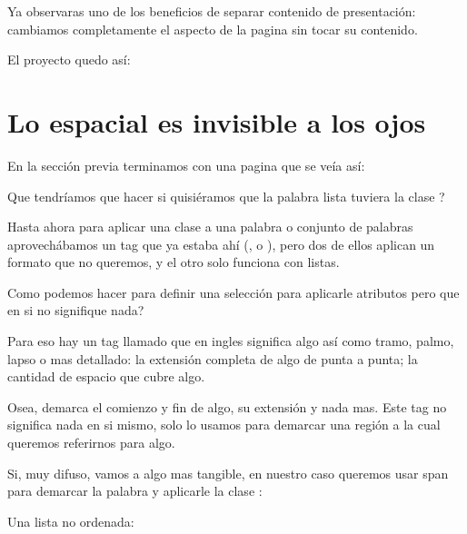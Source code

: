 \documentclass[letterpaper,10pt,spanish]{sphinxmanual}
\begin{document}
Ya observaras uno de los beneficios de separar contenido de presentación:
cambiamos completamente el aspecto de la pagina sin tocar su contenido.

El proyecto quedo así:

\begin{figure}[htbp]
\centering

\noindent{}
\end{figure}


\chapter{Lo espacial es invisible a los ojos}
\label{\detokenize{lo-espacial-es-invisible-a-los-ojos::doc}}\label{\detokenize{lo-espacial-es-invisible-a-los-ojos:lo-espacial-es-invisible-a-los-ojos}}
En la sección previa terminamos con una pagina que se veía así:

\begin{figure}[htbp]
\centering

\noindent{}
\end{figure}

Que tendríamos que hacer si quisiéramos que la palabra lista tuviera la clase ?

Hasta ahora para aplicar una clase a una palabra o conjunto de palabras aprovechábamos un tag que ya estaba ahí (,  o ), pero dos de ellos aplican
un formato que no queremos, y el otro solo funciona con listas.

Como podemos hacer para definir una selección para aplicarle atributos pero que
en si no signifique nada?

Para eso hay un tag llamado  que en ingles significa algo así como
tramo, palmo, lapso o mas detallado: la extensión completa de algo de punta a
punta; la cantidad de espacio que cubre algo.

Osea, demarca el comienzo y fin de algo, su extensión y nada mas. Este tag
no significa nada en si mismo, solo lo usamos para demarcar una región a la
cual queremos referirnos para algo.

Si, muy difuso, vamos a algo mas tangible, en nuestro caso queremos usar span
para demarcar la palabra  y aplicarle la clase :

%
\begin{sphinxVerbatim}[commandchars=\\\{\}]
    Una  lista no ordenada:
\end{sphinxVerbatim}
\end{document}
